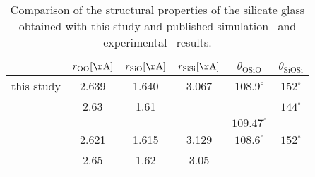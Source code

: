 \documentclass[aps,10pt,twocolumn]{revtex4}
\newcommand{\mrm}[1]{\ensuremath{\mathrm{#1}}\xspace}
\newcommand{\angstrom}{\ensuremath{\mrm{\AA}}\xspace}
\begin{document}
\begin{table}
\centering
\begin{tabular}{|c|c|c|c|c|c|}
\hline
& $r_{\mrm{OO}}[\angstrom]$		&$r_{\mrm{SiO}}[\angstrom]$	&$r_{\mrm{SiSi}}[\angstrom]$ &$\theta_\mrm{OSiO}$	& $\theta_\mrm{SiOSi}$	\\
\hline
this study								&2.639	&1.640	&3.067	& $108.9^\circ$		&$152^\circ$		\\
\cite{MozziWarren69,JohnsonWright83}	&2.63	&1.61	&		&					&$144^\circ$		\\
\cite{GrimleyWright90}					&		&		&		&$109.47^\circ$		&					\\
\cite{YuanCormack01,YuanCormack03}		&2.621	&1.615	&3.129	&$108.6^\circ$		&$152^\circ$		\\
\cite{VashishtaKalia90}					&2.65	&1.62	&3.05	&					&					\\
\hline
\end{tabular}\\
\caption{Comparison of the structural properties of the silicate glass obtained with this study and published
simulation~\cite{YuanCormack01,YuanCormack03,VashishtaKalia90} and
experimental~\cite{MozziWarren69,JohnsonWright83,GrimleyWright90} results.}
\label{tble:mkGlass}
\end{table}
\end{document}
